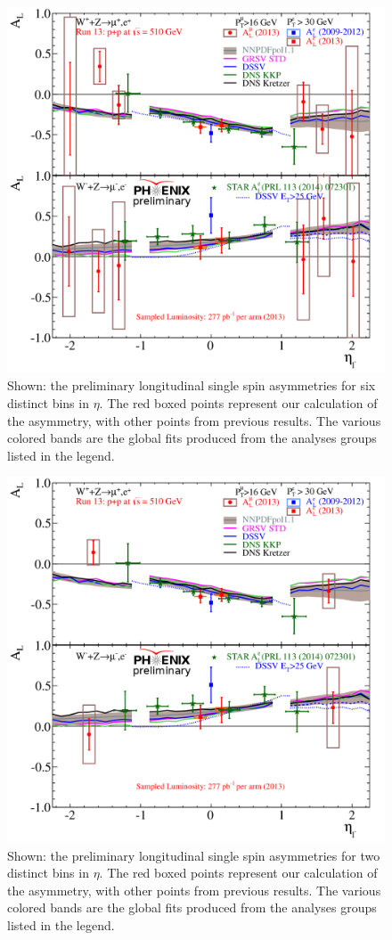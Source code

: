 \begin{figure}[ht]
  \centering
  \includegraphics[width=0.8\linewidth]{./figures/prelim_AL_6bins.jpg}
  \caption{
    Shown: the preliminary longitudinal single spin asymmetries for six distinct
    bins in $\eta$. The red boxed points represent our calculation of the asymmetry,
    with other points from previous results. The various colored bands are the
    global fits produced from the analyses groups listed in the legend.
  }
  \label{fig:al_preliminary_three_eta}
\end{figure}

\begin{figure}[ht]
  \centering
  \includegraphics[width=0.8\linewidth]{./figures/prelim_AL_2bins.jpg}
  \caption{
    Shown: the preliminary longitudinal single spin asymmetries for two distinct
    bins in $\eta$. The red boxed points represent our calculation of the asymmetry,
    with other points from previous results. The various colored bands are the
    global fits produced from the analyses groups listed in the legend.
  }
  \label{fig:al_preliminary_standard}
\end{figure}

